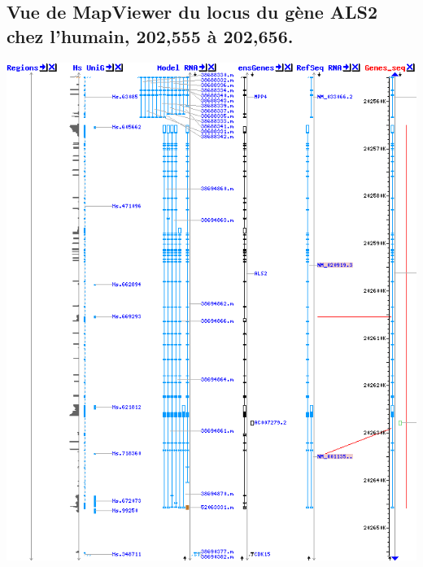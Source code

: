 \documentclass[10.9pt]{article} %
\begin{document}
\subsection{Vue de MapViewer du locus du gène ALS2 chez l'humain, 202,555 à 202,656.}\label{4}
\includegraphics[width=\linewidth]{annexes/question_1/annexe1b_mapviewer_202555-202656.png}
\end{document}
